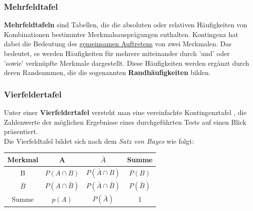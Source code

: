 \documentclass[a4paper,10pt,DIV9, BCOR12mm, oneside,openright,openbib]{scrreprt}
\theoremstyle{definition}
\theoremstyle{plain}
\begin{document}
\subsubsection{Mehrfeldtafel}
\textbf{Mehrfeldtafeln} sind Tabellen, die die absoluten oder relativen Häufigkeiten von Kombinationen bestimmter Merkmalsausprägungen enthalten. Kontingenz hat dabei die Bedeutung des \underline{gemeinsamen Auftretens} von zwei Merkmalen. Das bedeutet, es werden Häufigkeiten für mehrere miteinander durch 'und' oder 'sowie' verknüpfte Merkmale dargestellt. Diese Häufigkeiten werden ergänzt durch deren Randsummen, die die sogenannten \textbf{Randhäufigkeiten} bilden.\\ 

\subsubsection{Vierfeldertafel}
Unter einer \textbf{Vierfeldertafel} versteht man eine vereinfachte Kontingenztafel , die Zahlenwerte der möglichen Ergebnisse eines durchgeführten Tests auf einen Blick präsentiert. \\ 
Die Vierfeldtafel bildet sich nach dem \textit{Satz von Bayes} wie folgt: \\ 
\begin{center}
\begin{tabular}{|c|c|c|c|}
\hline Merkmal & A &$   \bar{A}  $ & Summe \\ 
\hline B &$   P({A}\cap{B}) $  &$   P({\bar{A}}\cap{B})  $ &$  P(B) $ \\ 
\hline  $ \bar{B} $  & $ P({A}\cap{\bar{B}}) $ & $  P({\bar{A}}\cap{\bar{B}}) $ & $ P({\bar{B}}) $  \\ 
\hline Summe & $ p(A) $ & $ P({\bar{A}}) $ & 1 \\ 
\hline 
\end{tabular}
\end{center}
\end{document}
